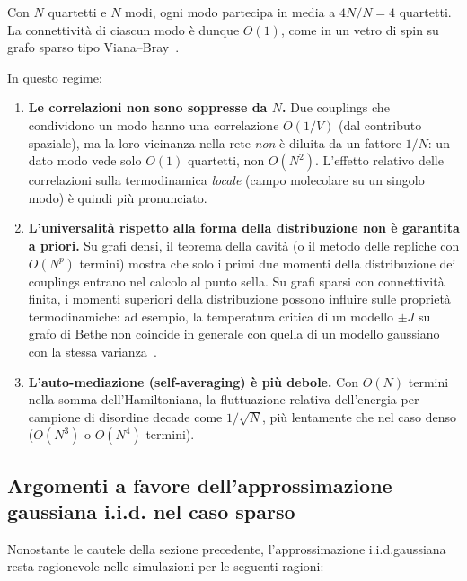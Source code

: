 \documentclass[11pt,a4paper]{article}
\begin{document}
Con $N$ quartetti e $N$ modi, ogni modo partecipa in media a
$4N / N = 4$ quartetti. La connettivit\`a di ciascun modo \`e dunque
$O(1)$, come in un vetro di spin su grafo sparso tipo
Viana--Bray~\cite{Viana1985}.

In questo regime:
\begin{enumerate}[nosep]
  \item \textbf{Le correlazioni non sono soppresse da $N$.}
    Due couplings che condividono un modo hanno una correlazione $O(1/V)$
    (dal contributo spaziale), ma la loro vicinanza nella rete \emph{non}
    \`e diluita da un fattore $1/N$: un dato modo vede solo $O(1)$
    quartetti, non $O(N^2)$. L'effetto relativo delle correlazioni sulla
    termodinamica \emph{locale} (campo molecolare su un singolo modo)
    \`e quindi pi\`u pronunciato.

  \item \textbf{L'universalit\`a rispetto alla forma della distribuzione
    non \`e garantita a priori.}
    Su grafi densi, il teorema della cavit\`a (o il metodo delle
    repliche con $O(N^p)$ termini) mostra che solo i primi due momenti
    della distribuzione dei couplings entrano nel calcolo al punto sella.
    Su grafi sparsi con connettivit\`a finita, i momenti superiori della
    distribuzione possono influire sulle propriet\`a termodinamiche:
    ad esempio, la temperatura critica di un modello $\pm J$ su grafo
    di Bethe non coincide in generale con quella di un modello
    gaussiano con la stessa varianza~\cite{MPV1987}.

  \item \textbf{L'auto-mediazione (self-averaging) \`e pi\`u debole.}
    Con $O(N)$ termini nella somma dell'Hamiltoniana, la fluttuazione
    relativa dell'energia per campione di disordine decade come
    $1/\sqrt{N}$, pi\`u lentamente che nel caso denso ($O(N^3)$ o
    $O(N^4)$ termini).
\end{enumerate}

\subsection{Argomenti a favore dell'approssimazione gaussiana i.i.d.\@
            nel caso sparso}

Nonostante le cautele della sezione precedente, l'approssimazione
i.i.d.\@ gaussiana resta ragionevole nelle simulazioni per le seguenti
ragioni:
\end{document}
